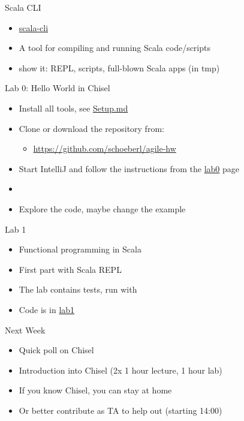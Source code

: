 \begin{frame}[fragile]{Scala CLI}
\begin{itemize}
\item \href{https://scala-cli.virtuslab.org/}{scala-cli}
\item A tool for compiling and running Scala code/scripts
\item show it: REPL, scripts, full-blown Scala apps (in tmp)
\end{itemize}
\end{frame}


\begin{frame}[fragile]{Lab 0: Hello World in Chisel}
\begin{itemize}
\item Install all tools, see \href{https://github.com/schoeberl/agile-hw/blob/main/Setup.md}{Setup.md}
\item Clone or download the repository from:
\begin{itemize}
\item \url{https://github.com/schoeberl/agile-hw}
\end{itemize}
\item Start IntelliJ and follow the instructions from the \href{https://github.com/schoeberl/agile-hw/tree/main/lab0}{lab0} page 
\item {}
\item Explore the code, maybe change the example
\end{itemize}
\end{frame}

\begin{frame}[fragile]{Lab 1}
\begin{itemize}
\item Functional programming in Scala
\item First part with Scala REPL
\item The lab contains tests, run with 
\item Code is in \href{https://github.com/schoeberl/agile-hw/tree/main/lab1}{lab1}
\end{itemize}
\end{frame}

\begin{frame}[fragile]{Next Week}
\begin{itemize}
\item Quick poll on Chisel
\item Introduction into Chisel (2x 1 hour lecture, 1 hour lab)
\item If you know Chisel, you can stay at home
\item Or better contribute as TA to help out (starting 14:00)
\end{itemize}
\end{frame}



